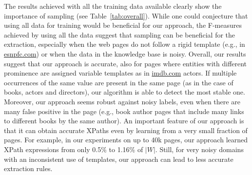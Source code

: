 The results achieved with all the training data available clearly show the importance of sampling (see Table~\ref{tab:overall}). 
While one could conjecture that using all data for training would be beneficial for our approach, the F-measures achieved by using all the data suggest that sampling can be beneficial for the extraction, especially when the web pages do not follow a rigid template (e.g., in \url{esnpfc.com}) or when the data in the knowledge base is noisy. 
Overall, our results suggest that our approach is accurate, also for pages where entities with different prominence are assigned variable templates as in \url{imdb.com} actors. 
If multiple occurrences of the same value are present in the same page (as in the case of books, actors and directors), our algorithm is able to detect the most stable one.
Moreover, our approach seems robust against noisy labels, even when there are many false positive in the page (e.g., book author pages that include many links to different books by the same author).
An important feature of our approach is that it can obtain accurate XPaths even by learning from a very small fraction of pages. 
For example, in our experiments on up to 40k pages, our approach learned XPath expressions from only 0.5\% to 1.16\% of $|W|$.
Still, for very noisy domains with an inconsistent use of templates, our approach can lead to less accurate extraction rules.


